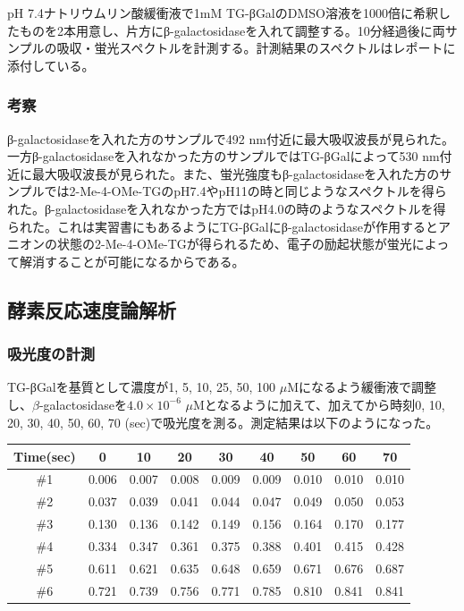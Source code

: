 \documentclass[a4paper,papersize,dvipdfmx]{jsarticle}
\begin{document}
pH 7.4ナトリウムリン酸緩衝液で1mM TG-βGalのDMSO溶液を1000倍に希釈したものを2本用意し、片方にβ-galactosidaseを入れて調整する。10分経過後に両サンプルの吸収・蛍光スペクトルを計測する。計測結果のスペクトルはレポートに添付している。

\subsubsection*{考察}
β-galactosidaseを入れた方のサンプルで492 nm付近に最大吸収波長が見られた。一方β-galactosidaseを入れなかった方のサンプルではTG-βGalによって530 nm付近に最大吸収波長が見られた。また、蛍光強度もβ-galactosidaseを入れた方のサンプルでは2-Me-4-OMe-TGのpH7.4やpH11の時と同じようなスペクトルを得られた。β-galactosidaseを入れなかった方ではpH4.0の時のようなスペクトルを得られた。これは実習書にもあるようにTG-βGalにβ-galactosidaseが作用するとアニオンの状態の2-Me-4-OMe-TGが得られるため、電子の励起状態が蛍光によって解消することが可能になるからである。

\subsection*{酵素反応速度論解析}

\subsubsection*{吸光度の計測}
TG-βGalを基質として濃度が1, 5, 10, 25, 50, 100 $\mu$Mになるよう緩衝液で調整し、$\beta$-galactosidaseを$4.0 \times 10^{-6}$ $\mu$Mとなるように加えて、加えてから時刻0, 10, 20, 30, 40, 50, 60, 70 (sec)で吸光度を測る。測定結果は以下のようになった。

\begin{table}[H]
\begin{center}
\begin{tabular}{|c|c|c|c|c|c|c|c|c|}
\hline
Time(sec) & 0     & 10    & 20    & 30    & 40    & 50    & 60    & 70    \\ \hline
\#1       & 0.006 & 0.007 & 0.008 & 0.009 & 0.009 & 0.010 & 0.010 & 0.010 \\ \hline
\#2       & 0.037 & 0.039 & 0.041 & 0.044 & 0.047 & 0.049 & 0.050 & 0.053 \\ \hline
\#3       & 0.130 & 0.136 & 0.142 & 0.149 & 0.156 & 0.164 & 0.170 & 0.177 \\ \hline
\#4       & 0.334 & 0.347 & 0.361 & 0.375 & 0.388 & 0.401 & 0.415 & 0.428 \\ \hline
\#5       & 0.611 & 0.621 & 0.635 & 0.648 & 0.659 & 0.671 & 0.676 & 0.687 \\ \hline
\#6       & 0.721 & 0.739 & 0.756 & 0.771 & 0.785 & 0.810 & 0.841 & 0.841 \\ \hline
\end{tabular}
\end{center}
\end{table}
\end{document}

